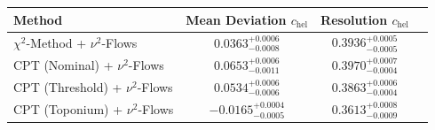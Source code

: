     \begin{tabular}{lccc}
        \toprule
        Method & Mean Deviation $c_{\text{hel}}$ & Resolution $c_{\text{hel}}$ \\
        \midrule
        $\chi^2$-Method + $\nu^2$-Flows & $0.0363^{+0.0006}_{-0.0008}$ & $0.3936^{+0.0005}_{-0.0005}$ \\
        CPT (Nominal) + $\nu^2$-Flows & $0.0653^{+0.0006}_{-0.0011}$ & $0.3970^{+0.0007}_{-0.0004}$ \\
        CPT (Threshold) + $\nu^2$-Flows & $0.0534^{+0.0006}_{-0.0006}$ & $0.3863^{+0.0006}_{-0.0004}$ \\
        CPT (Toponium) + $\nu^2$-Flows & $-0.0165^{+0.0004}_{-0.0005}$ & $0.3613^{+0.0008}_{-0.0009}$ \\
        \bottomrule
    \end{tabular}